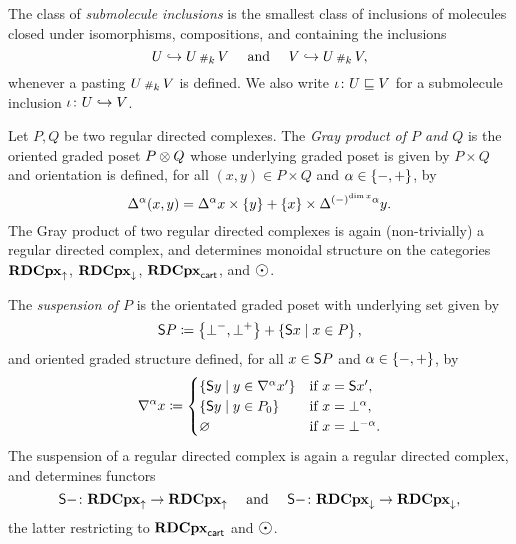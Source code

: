 The class of \emph{submolecule inclusions} is the smallest class of inclusions of molecules closed under isomorphisms, compositions, and containing the inclusions
\begin{equation*}
    U \incl U \cp{k} V \quad\text{ and }\quad V \incl U \cp{k} V,
\end{equation*}
whenever a pasting \( U \cp{k} V \) is defined. 
We also write \( \iota \colon U \submol V \) for a submolecule inclusion \( \iota \colon U \incl V \).

Let \( P, Q \) be two regular directed complexes.
The \emph{Gray product of \( P \) and \( Q \)} is the oriented graded poset \( P \gray Q \) whose underlying graded poset is given by \( P \times Q \) and orientation is defined, for all \( (x, y) \in P \times Q \) and \( \a \in \set{-, +} \), by
\begin{equation*}
    \faces{}{\a} (x, y) = \faces{}{\a} x \times \set{y} + \set{x} \times \faces{}{(-)^{\dim x} \a} y.
\end{equation*}  
The Gray product of two regular directed complexes is again (non-trivially) a regular directed complex, and determines monoidal structure on the categories \( \rdcpxcomap \), \( \rdcpxmap \), \( \rdcpxcart \), and \( \atom \).

The \emph{suspension of \( P \)} is the orientated graded poset with underlying set given by
\begin{equation*}
    \sus{P} \eqdef \set{\bot^-, \bot^+} + \set{\sus{x} \mid x \in P},
\end{equation*}
and oriented graded structure defined, for all \( x \in \sus{P} \) and \( \a \in \set{-, +} \), by
\begin{equation*}
    \cofaces{}{\a} x \eqdef 
    \begin{cases}
        \set{\sus{y} \mid y \in \cofaces{}{\a} x'} & \text{if } x = \sus{x'}, \\
        \set{\sus{y} \mid y \in \gr{0}{P}} & \text{if } x = \bot^\a, \\
        \varnothing & \text{if } x = \bot^{- \a}.
    \end{cases}
\end{equation*}
The suspension of a regular directed complex is again a regular directed complex, and determines functors
\begin{equation*}
    \sus{-} \colon \rdcpxcomap \to \rdcpxcomap \quad\text{ and }\quad \sus{-} \colon \rdcpxmap \to \rdcpxmap,
\end{equation*}
the latter restricting to \( \rdcpxcart \) and \( \atom \).

